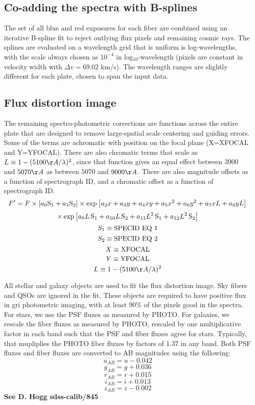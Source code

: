 \documentclass[12pt,preprint]{aastex}
\begin{document}
\subsection{Co-adding the spectra with B-splines}

The set of all blue and red exposures for each fiber are
combined using an iterative B-spline fit to reject outlying flux pixels
and remaining cosmic rays.
The splines are evaluated on a wavelength grid that
is uniform is log-wavelengths, with the scale always chosen
as $10^{-4}$ in log$_{10}$-wavelength (pixels are constant in 
velocity width with $\Delta v = 69.02$ km/s).  The wavelength ranges are
slightly different for each plate, chosen to span the input data.

\subsection{Flux distortion image}

The remaining spectro-photometric corrections are functions across
the entire plate that are designed to remove large-spatial scale centering
and guiding errors.
Some of the terms are achromatic with position on the focal plane
(X=XFOCAL and Y=YFOCAL).  There are also chromatic terms that scale
as $ L \equiv 1 - (5100\AA / \lambda)^2 $, since that function gives
an equal effect between $3900$ and $5070\AA$ as between $5070$
and $9000\AA$.
There are also magnitude offsets as a function of spectrograph ID,
and a chromatic offset as a function of spectrograph ID.
$$ F' =  F  \times \left[ a_0 {\rm S_1} + a_1 {\rm S_2} \right]
 \times \exp \left[ a_2 x + a_3 y + a_4 xy + a_5 x^2 + a_6 y^2  + a_7 xL + a_8 yL \right] $$
$$  \times \exp \left[ a_9 L \, {\rm S_1} + a_{10} L \, {\rm S_2}
  + a_{11} L^2 \, {\rm S_1} + a_{12} L^2 \, {\rm S_2} \right]  $$
$$ S_1 \equiv {\rm SPECID~EQ~1} $$
$$ S_2 \equiv {\rm SPECID~EQ~2} $$
$$ X \equiv {\rm XFOCAL} $$
$$ Y \equiv {\rm YFOCAL} $$
$$ L \equiv 1 - (5100\AA / \lambda)^2 $$

All stellar and galaxy objects are used to fit the flux distortion
image.  Sky fibers and QSOs are ignored in the fit.
These objects are required to have positive flux in gri photometric imaging,
with at least $90\%$ of the pixels good in the spectra.
For stars, we use the PSF fluxes as measured by PHOTO.
For galaxies, we rescale the fiber fluxes as measured by PHOTO,
rescaled by one multiplicative factor in each band such that the
PSF and fiber fluxes agree for stars.  Typically, that mupliplies
the PHOTO fiber fluxes by factors of 1.37 in any band.
Both PSF fluxes and fiber fluxes are converted to AB magnitudes
using the following:
$$ u_{AB} = u - 0.042 $$
$$ g_{AB} = g + 0.036 $$
$$ r_{AB} = r + 0.015 $$
$$ i_{AB} = i + 0.013 $$
$$ z_{AB} = z - 0.002 $$
{\bf See D. Hogg sdss-calib/845}
\end{document}
